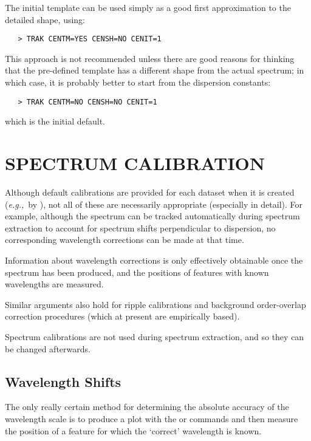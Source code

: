 The initial template can be used simply as a good first approximation to the
detailed shape, using:

\begin{verbatim}
   > TRAK CENTM=YES CENSH=NO CENIT=1
\end{verbatim}

This approach is not recommended unless there are good reasons for thinking
that the pre-defined template has a different shape from the actual spectrum;
in which case, it is probably better to start from the dispersion constants:

\begin{verbatim}
   > TRAK CENTM=NO CENSH=NO CENIT=1
\end{verbatim}

which is the initial default.


\section{\label{se:spec_calib}SPECTRUM
         CALIBRATION}

Although default calibrations are provided for each dataset when it is created
({\it{e.g.,}}\ by ), not all of these are
necessarily appropriate (especially in detail)\@.  For example, although the
spectrum can be tracked automatically during spectrum extraction to account
for spectrum shifts perpendicular to dispersion, no corresponding wavelength
corrections can be made at that time.

Information about wavelength corrections is only effectively obtainable
once the spectrum has been produced, and the positions of features with known
wavelengths are measured.

Similar arguments also hold for ripple calibrations and background
order-overlap correction procedures (which at present are empirically based)\@.

Spectrum calibrations are not used during spectrum extraction, and so they
can be changed afterwards.


\subsection{Wavelength Shifts}

The only really certain method for determining the absolute accuracy of the
wavelength scale is to produce a plot with the 
or  commands and then measure the
position of a feature for which the `correct' wavelength is known.

